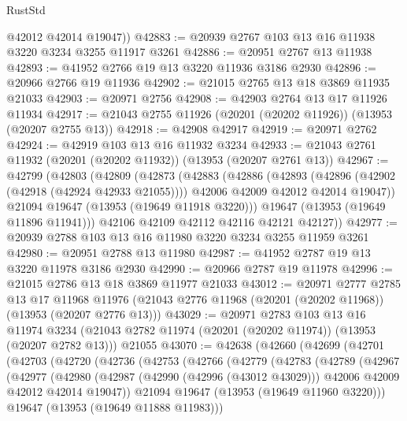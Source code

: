 \begin{lexlean}{RustStd}
\begin{coremodule}
        @42012
        @42014
        @19047))
@42883 := @20939 @2767 @103 @13 @16 @11938 @3220 @3234 @3255 @11917 @3261
@42886 := @20951 @2767 @13 @11938
@42893 := @41952 @2766 @19 @13 @3220 @11936 @3186 @2930
@42896 := @20966 @2766 @19 @11936
@42902 := @21015 @2765 @13 @18 @3869 @11935 @21033
@42903 := @20971 @2756
@42908 := @42903 @2764 @13 @17 @11926 @11934
@42917 := @21043 @2755 @11926 (@20201 (@20202 @11926)) (@13953 (@20207 @2755 @13))
@42918 := @42908 @42917
@42919 := @20971 @2762
@42924 := @42919 @103 @13 @16 @11932 @3234
@42933 := @21043 @2761 @11932 (@20201 (@20202 @11932)) (@13953 (@20207 @2761 @13))
@42967 := @42799
    (@42803
      (@42809
        (@42873
          (@42883
            (@42886
              (@42893
                (@42896 (@42902 (@42918 (@42924 @42933 @21055))))
                @42006
                @42009
                @42012
                @42014
                @19047))
            @21094
            @19647
            (@13953 (@19649 @11918 @3220)))
          @19647
          (@13953 (@19649 @11896 @11941)))
        @42106
        @42109
        @42112
        @42116
        @42121
        @42127))
@42977 := @20939 @2788 @103 @13 @16 @11980 @3220 @3234 @3255 @11959 @3261
@42980 := @20951 @2788 @13 @11980
@42987 := @41952 @2787 @19 @13 @3220 @11978 @3186 @2930
@42990 := @20966 @2787 @19 @11978
@42996 := @21015 @2786 @13 @18 @3869 @11977 @21033
@43012 := @20971
    @2777
    @2785
    @13
    @17
    @11968
    @11976
    (@21043 @2776 @11968 (@20201 (@20202 @11968)) (@13953 (@20207 @2776 @13)))
@43029 := @20971
    @2783
    @103
    @13
    @16
    @11974
    @3234
    (@21043 @2782 @11974 (@20201 (@20202 @11974)) (@13953 (@20207 @2782 @13)))
    @21055
@43070 := @42638
    (@42660
      (@42699
        (@42701
          (@42703
            (@42720
              (@42736
                (@42753
                  (@42766
                    (@42779
                      (@42783
                        (@42789
                          (@42967
                            (@42977
                              (@42980
                                (@42987
                                  (@42990 (@42996 (@43012 @43029)))
                                  @42006
                                  @42009
                                  @42012
                                  @42014
                                  @19047))
                              @21094
                              @19647
                              (@13953 (@19649 @11960 @3220)))
                            @19647
                            (@13953 (@19649 @11888 @11983)))

\end{coremodule}
\end{lexlean}
